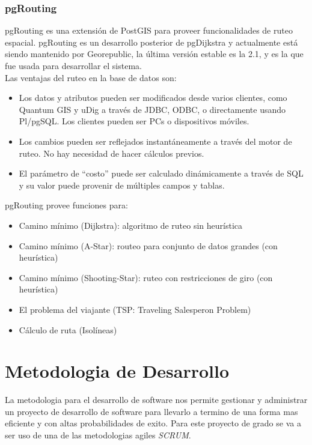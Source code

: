       \subsubsection{pgRouting} %
      \label{sec:pgrouting}
        pgRouting es una extensi\'on  de  PostGIS para proveer funcionalidades de ruteo espacial. pgRouting es un desarrollo posterior de pgDijkstra y actualmente está siendo mantenido por Georepublic, la última versi\'on estable es la 2.1, y es la que fue usada para desarrollar el sistema.\\

        Las ventajas del ruteo en la base de datos son:
        \begin{itemize}
          \item Los datos y atributos pueden ser modificados desde varios clientes, como Quantum GIS y uDig a través de JDBC, ODBC, o directamente usando Pl/pgSQL. Los clientes pueden ser PCs o dispositivos móviles.
          \item Los cambios pueden ser reflejados instantáneamente a través del motor de ruteo. No hay necesidad de hacer cálculos previos.
          \item El parámetro de ``costo'' puede ser calculado dinámicamente a través de SQL y su valor puede provenir de múltiples campos y tablas.
        \end{itemize}

        pgRouting provee funciones para:
        \begin{itemize}
          \item Camino mínimo (Dijkstra): algoritmo de ruteo sin heurística
          \item Camino mínimo (A-Star): routeo para conjunto de datos grandes (con heurística)
          \item Camino mínimo (Shooting-Star): ruteo con restricciones de giro (con heurística)
          \item El problema del viajante (TSP: Traveling Salesperon Problem)
          \item Cálculo de ruta (Isolíneas)
        \end{itemize}


  \section{Metodologia de Desarrollo}
  \label{sec:metodologia_de_desarrollo}
    La metodologia para el desarrollo de software nos permite gestionar y administrar un proyecto de desarrollo de software para llevarlo a termino de una forma mas eficiente y con altas probabilidades de exito.
    Para este proyecto de grado se va a ser uso de una de las metodologias agiles \emph{SCRUM}.

